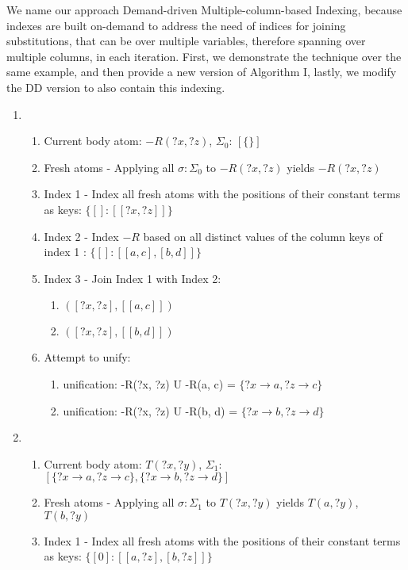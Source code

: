 \documentclass[sigconf,screen,review,natbib]{acmart}
\theoremstyle{definition}
\begin{document}
We name our approach Demand-driven Multiple-column-based Indexing, because indexes are built on-demand to address the need of indices for
joining substitutions, that can be over multiple variables, therefore spanning over multiple columns, in each iteration. First, we demonstrate
the technique over the same example, and then provide a new version of Algorithm I, lastly, we modify the DD version to
also contain this indexing.
\begin{enumerate}
	\item \begin{enumerate}
		      \item Current body atom: $-R(?x, ?z)$, $\Sigma_0$: $[\{\}]$
		      \item Fresh atoms - Applying all $\sigma : \Sigma_0$ to $-R(?x, ?z)$ yields $-R(?x, ?z)$
		      \item Index 1 - Index all fresh atoms with the positions of their constant terms as keys: $\{[] : [[?x, ?z]]\}$
		      \item Index 2 - Index $-R$ based on all distinct values of the column keys of index 1 : $\{[]: [[a, c], [b, d]]\}$
		      \item Index 3 - Join Index 1 with Index 2:
		            \begin{enumerate}
			            \item $([?x, ?z], [[a, c]])$
			            \item $([?x, ?z], [[b, d]])$
		            \end{enumerate}
		      \item Attempt to unify:
		            \begin{enumerate}
			            \item unification: -R(?x, ?z) U -R(a, c) = $\{?x \rightarrow a, ?z \rightarrow c\}$
			            \item unification: -R(?x, ?z) U -R(b, d) = $\{?x \rightarrow b, ?z \rightarrow d\}$
		            \end{enumerate}
	      \end{enumerate}
	\item \begin{enumerate}
		      \item Current body atom: $T(?x, ?y)$, $\Sigma_1$: $[\{?x \rightarrow a, ?z \rightarrow c\}, \{?x \rightarrow b, ?z \rightarrow d\}]$
		      \item Fresh atoms - Applying all $\sigma : \Sigma_1$ to $T(?x, ?y)$ yields $T(a, ?y)$, $T(b, ?y)$
		      \item Index 1 - Index all fresh atoms with the positions of their constant terms as keys: $\{[0] : [[a, ?z], [b, ?z]]\}$

\end{enumerate}
\end{enumerate}
\end{document}
